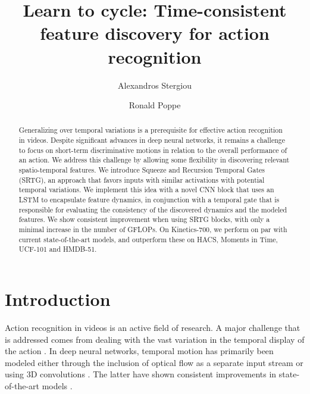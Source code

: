 \documentclass[final,5p,times,twocolumn]{elsarticle}
\begin{document}
\begin{frontmatter}

\title{Learn to cycle: Time-consistent feature discovery for action recognition}
\author{Alexandros Stergiou} 
\author{Ronald Poppe}

\address{Utrecht University, Princetonplein 5, 3584 CC Utrecht, The Netherlands}


\begin{abstract}
Generalizing over temporal variations is a prerequisite for effective action recognition in videos. Despite significant advances in deep neural networks, it remains a challenge to focus on short-term discriminative motions in relation to the overall performance of an action. We address this challenge by allowing some flexibility in discovering relevant spatio-temporal features. We introduce Squeeze and Recursion Temporal Gates (SRTG), an approach that favors inputs with similar activations with potential temporal variations. We implement this idea with a novel CNN block that uses an LSTM to encapsulate feature dynamics, in conjunction with a temporal gate that is responsible for evaluating the consistency of the discovered dynamics and the modeled features. We show consistent improvement when using SRTG blocks, with only a minimal increase in the number of GFLOPs. On Kinetics-700, we perform on par with current state-of-the-art models, and outperform these on HACS, Moments in Time, UCF-101 and HMDB-51.\footnotemark
\end{abstract}



\end{frontmatter}



\section{Introduction}
\label{introduction}

Action recognition in videos is an active field of research. A major challenge that is addressed comes from dealing with the vast variation in the temporal display of the action \citep{herath2017going,stergiou2019analyzing}. In deep neural networks, temporal motion has primarily been modeled either through the inclusion of optical flow as a separate input stream \cite{simonyan2014two} or using 3D convolutions \cite{ji20133d}. The latter have shown consistent improvements in state-of-the-art models \citep{carreira2017quo,chen2018multifiber,feichtenhofer2019slowfast,feichtenhofer2020x3d}.
\end{document}
